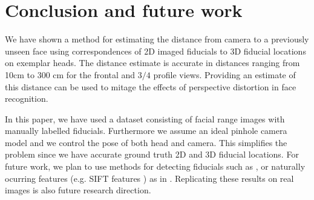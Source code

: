 \documentclass[runningheads]{llncs}
\begin{document}
\section{Conclusion and future work} \label{sec:discussion}
We have shown a method for estimating the distance from camera to a previously unseen face using correspondences of 2D imaged fiducials to 3D fiducial locations on exemplar heads.  
The distance estimate is accurate in distances ranging from 10cm to 300 cm for the frontal and $3/4$ profile views.  
Providing an estimate of this distance can be used to mitage the effects of perspective distortion in face recognition.  

In this paper, we have used a dataset consisting of facial range images with manually labelled fiducials.    
Furthermore we assume an ideal pinhole camera model and we control the pose of both head and camera.  
This simplifies the problem since we have accurate ground truth 2D and 3D fiducial locations. 
For future work, we plan to use methods for detecting fiducials such as \cite{belhumeur2011localizing}, or naturally ocurring features (e.g. SIFT features \cite{lowe}) as in \cite{ohayon2006robust}.
Replicating these results on real images is also future research direction.




\end{document}
